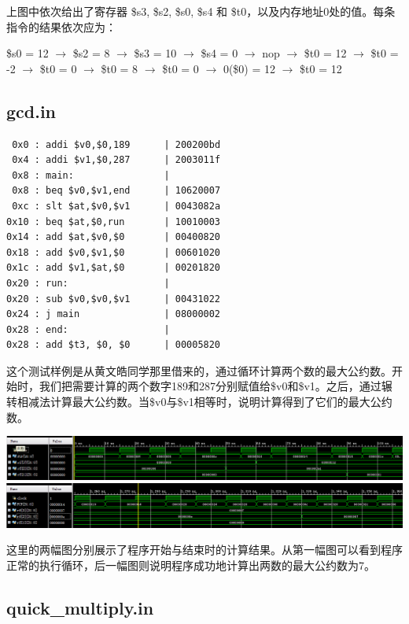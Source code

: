 \documentclass[12pt]{article} %
\begin{document}
\begin{sloppypar}
上图中依次给出了寄存器 \$s3, \$s2, \$s0, \$s4 和 \$t0，以及内存地址0处的值。每条指令的结果依次应为：

\$s0 = 12 $\rightarrow$
\$s2 = 8 $\rightarrow$
\$s3 = 10 $\rightarrow$
\$s4 = 0 $\rightarrow$
nop $\rightarrow$
\$t0 = 12 $\rightarrow$
\$t0 = -2 $\rightarrow$
\$t0 = 0 $\rightarrow$
\$t0 = 8 $\rightarrow$
\$t0 = 0 $\rightarrow$
0(\$0) = 12 $\rightarrow$
\$t0 = 12


\subsection{gcd.in}

\begin{lstlisting}
 0x0 : addi $v0,$0,189      | 200200bd
 0x4 : addi $v1,$0,287      | 2003011f
 0x8 : main:                | 
 0x8 : beq $v0,$v1,end      | 10620007
 0xc : slt $at,$v0,$v1      | 0043082a
0x10 : beq $at,$0,run       | 10010003
0x14 : add $at,$v0,$0       | 00400820
0x18 : add $v0,$v1,$0       | 00601020
0x1c : add $v1,$at,$0       | 00201820
0x20 : run:                 | 
0x20 : sub $v0,$v0,$v1      | 00431022
0x24 : j main               | 08000002
0x28 : end:                 | 
0x28 : add $t3, $0, $0      | 00005820

\end{lstlisting}

这个测试样例是从黄文皓同学那里借来的，通过循环计算两个数的最大公约数。开始时，我们把需要计算的两个数字189和287分别赋值给\$v0和\$v1。之后，通过辗转相减法计算最大公约数。当\$v0与\$v1相等时，说明计算得到了它们的最大公约数。

\noindent
\includegraphics[width =\linewidth]{figure/gcd1.png}
\includegraphics[width =\linewidth]{figure/gcd2.png}

这里的两幅图分别展示了程序开始与结束时的计算结果。从第一幅图可以看到程序正常的执行循环，后一幅图则说明程序成功地计算出两数的最大公约数为7。


\subsection{quick\_multiply.in}


\end{sloppypar}
\end{document}
